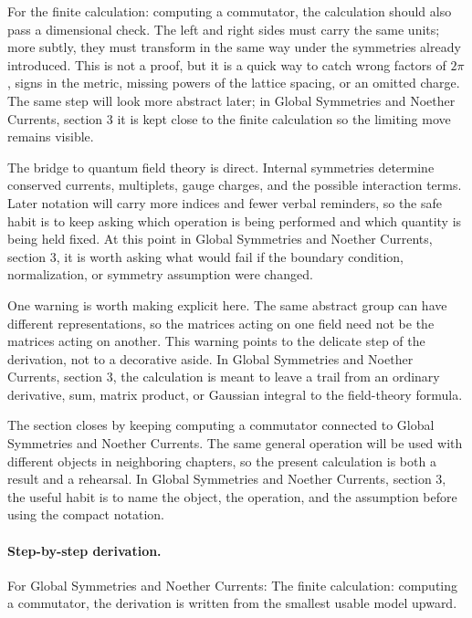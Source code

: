 For the finite calculation: computing a commutator, the calculation should also pass a dimensional check.  The left and right sides must carry the same units; more subtly, they must transform in the same way under the symmetries already introduced.  This is not a proof, but it is a quick way to catch wrong factors of \(2\pi\), signs in the metric, missing powers of the lattice spacing, or an omitted charge.  The same step will look more abstract later; in Global Symmetries and Noether Currents, section 3 it is kept close to the finite calculation so the limiting move remains visible.

The bridge to quantum field theory is direct.  Internal symmetries determine conserved currents, multiplets, gauge charges, and the possible interaction terms.  Later notation will carry more indices and fewer verbal reminders, so the safe habit is to keep asking which operation is being performed and which quantity is being held fixed.  At this point in Global Symmetries and Noether Currents, section 3, it is worth asking what would fail if the boundary condition, normalization, or symmetry assumption were changed.

One warning is worth making explicit here.  The same abstract group can have different representations, so the matrices acting on one field need not be the matrices acting on another.  This warning points to the delicate step of the derivation, not to a decorative aside.  In Global Symmetries and Noether Currents, section 3, the calculation is meant to leave a trail from an ordinary derivative, sum, matrix product, or Gaussian integral to the field-theory formula.

The section closes by keeping computing a commutator connected to Global Symmetries and Noether Currents.  The same general operation will be used with different objects in neighboring chapters, so the present calculation is both a result and a rehearsal.  In Global Symmetries and Noether Currents, section 3, the useful habit is to name the object, the operation, and the assumption before using the compact notation.



\paragraph{Step-by-step derivation.}

For Global Symmetries and Noether Currents: The finite calculation: computing a commutator, the derivation is written from the smallest usable model upward.

